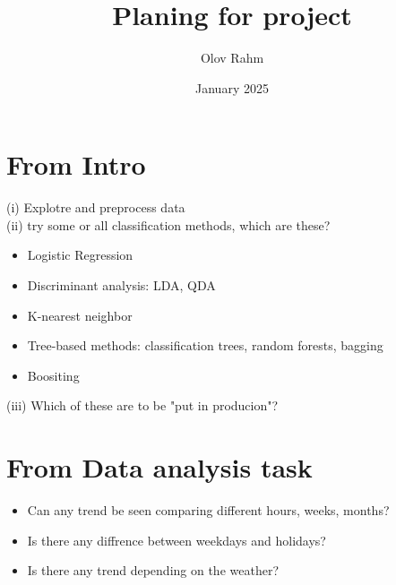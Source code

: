 \documentclass{article}
\title{Planing for project}
\author{Olov Rahm}
\date{January 2025}
\begin{document}
\maketitle
\section{From Intro}
\noindent
(i) Explotre and preprocess data
\\
(ii) try some or all classification methods, which are these?
\begin{itemize}
    \item Logistic Regression
    \item Discriminant analysis: LDA, QDA
    \item K-nearest neighbor
    \item Tree-based methods: classification trees, random forests, bagging
    \item Boositing
\end{itemize}
(iii) Which of these are to be "put in producion"?

\section{From Data analysis task}
\begin{itemize}
    \item Can any trend be seen comparing different hours, weeks, months?
    \item Is there any diffrence between weekdays and holidays?
    \item Is there any trend depending on the weather?
\end{itemize}
\end{document}
